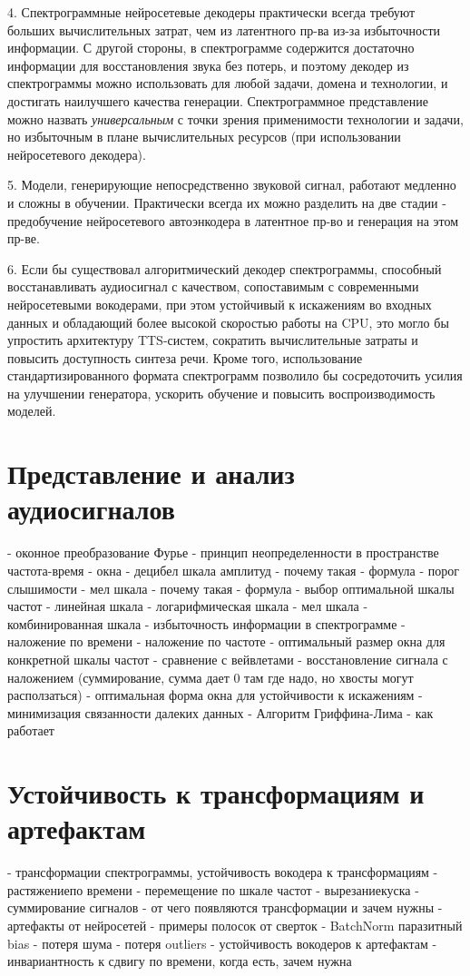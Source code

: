 4. Спектрограммные нейросетевые декодеры практически всегда требуют больших вычислительных затрат, чем из латентного пр-ва из-за избыточности информации. 
С другой стороны, в спектрограмме содержится достаточно информации для восстановления звука без потерь, 
и поэтому декодер из спектрограммы можно использовать для любой задачи, домена и технологии, и достигать наилучшего качества генерации.
Спектрограммное представление можно назвать \textit{универсальным} с точки зрения применимости технологии и задачи, но избыточным в плане вычислительных ресурсов 
(при использовании нейросетевого декодера).

5. Модели, генерирующие непосредственно звуковой сигнал, работают медленно и сложны в обучении. Практически всегда их можно разделить на две стадии - предобучение нейросетевого автоэнкодера в латентное пр-во и генерация на этом пр-ве.

6. Если бы существовал алгоритмический декодер спектрограммы, способный восстанавливать аудиосигнал с качеством, 
сопоставимым с современными нейросетевыми вокодерами, при этом устойчивый к искажениям во входных данных и обладающий более высокой скоростью работы на CPU, 
это могло бы упростить архитектуру TTS-систем, сократить вычислительные затраты и повысить доступность синтеза речи. 
Кроме того, использование стандартизированного формата спектрограмм позволило бы сосредоточить усилия на улучшении генератора, 
ускорить обучение и повысить воспроизводимость моделей.


\section{Представление и анализ аудиосигналов}
 - оконное преобразование Фурье
 - принцип неопределенности в пространстве частота-время
 - окна
 - децибел шкала амплитуд
   - почему такая
   - формула
   - порог слышимости
 - мел шкала
   - почему такая
   - формула
 - выбор оптимальной шкалы частот
  - линейная шкала
  - логарифмическая шкала
  - мел шкала
  - комбинированная шкала
 - избыточность информации в спектрограмме
 - наложение по времени
 - наложение по частоте
 - оптимальный размер окна для конкретной шкалы частот
 - сравнение с вейвлетами
 - восстановление сигнала с наложением (суммирование, сумма дает 0 там где надо, но хвосты могут расползаться)
 - оптимальная форма окна для устойчивости к искажениям
   - минимизация связанности далеких данных
 - Алгоритм Гриффина-Лима
    - как работает

 \section{Устойчивость к трансформациям и артефактам}
 - трансформации спектрограммы, устойчивость вокодера к трансформациям
   - растяжение по времени
   - перемещение по шкале частот
   - вырезание куска
   - суммирование сигналов
 - от чего появляются трансформации и зачем нужны
 - артефакты от нейросетей
   - примеры полосок от сверток
   - BatchNorm паразитный bias
   - потеря шума
   - потеря outliers
 - устойчивость вокодеров к артефактам
 - инвариантность к сдвигу по времени, когда есть, зачем нужна

